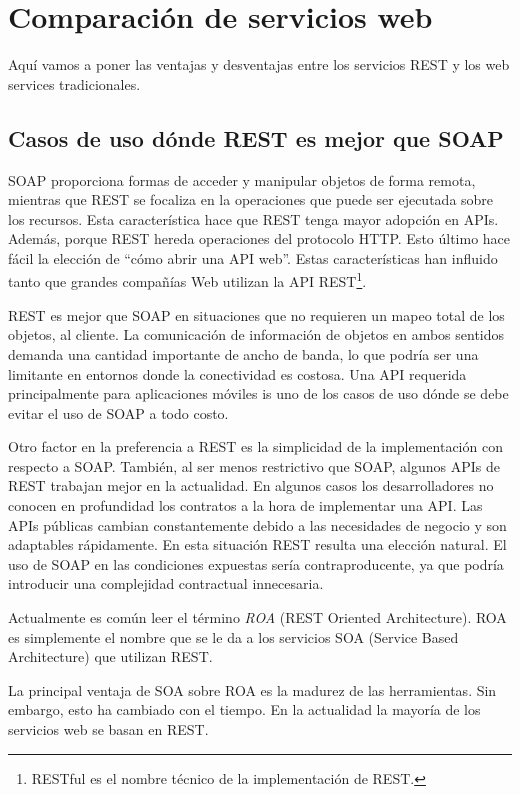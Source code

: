 \documentclass[conference]{IEEEtran}
\begin{document}
\section{Comparación de servicios web}
\label{sec:comparacion}

Aquí vamos a poner las ventajas y desventajas entre los servicios REST
y los web services tradicionales.

\subsection{Casos de uso dónde REST es mejor que SOAP}
\label{sec:cu-rest-better-soap}

SOAP proporciona formas de acceder y manipular objetos de forma
remota, mientras que REST se focaliza en la operaciones que puede ser
ejecutada sobre los recursos. Esta característica hace que REST tenga
mayor adopción en APIs. Además, porque REST hereda operaciones del
protocolo HTTP. Esto último hace fácil la elección de ``cómo abrir una
API web''. Estas características han influido tanto que grandes
compañías Web utilizan la API REST\footnote{RESTful es el nombre
  técnico de la implementación de REST.}.

REST es mejor que SOAP en situaciones que no requieren un mapeo total
de los objetos, al cliente. La comunicación de información de objetos
en ambos sentidos demanda una cantidad importante de ancho de banda,
lo que podría ser una limitante en entornos donde la conectividad es
costosa. Una API requerida principalmente para aplicaciones móviles is
uno de los casos de uso dónde se debe evitar el uso de SOAP a todo
costo. 

Otro factor en la preferencia a REST es la simplicidad de la
implementación con respecto a SOAP. También, al ser menos restrictivo
que SOAP, algunos APIs de REST trabajan mejor en la actualidad. En
algunos casos los desarrolladores no conocen en profundidad los
contratos a la hora de implementar una API. Las APIs públicas cambian
constantemente debido a las necesidades de negocio y son adaptables
rápidamente. En esta situación REST resulta una elección
natural. El uso de SOAP en las condiciones expuestas sería
contraproducente, ya que podría introducir una complejidad contractual
innecesaria. 

Actualmente es común leer el término \emph{ROA} (REST Oriented
Architecture). ROA es simplemente el nombre que se le da a los
servicios SOA (Service Based Architecture) que utilizan REST.

La principal ventaja de SOA sobre ROA es la madurez de las
herramientas. Sin embargo, esto ha cambiado con el tiempo. En la
actualidad la mayoría de los servicios web se basan en REST.
\end{document}
